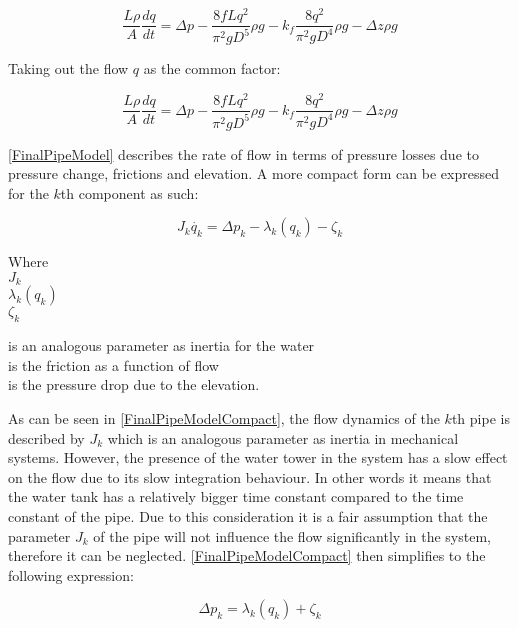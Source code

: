 \begin{equation}
   \frac{L \rho}{A} \frac{dq}{dt} =\Delta p - \frac{8fLq^2}{\pi^{2}gD^5} \rho g - k_f \frac{8q^2}{\pi^2gD^4} \rho g - \Delta z \rho g 
\end{equation}

Taking out the flow $q$ as the common factor:

\begin{equation}
\label{FinalPipeModel}
   \frac{L \rho}{A} \frac{dq}{dt} =\Delta p - \frac{8fLq^2}{\pi^{2}gD^5} \rho g - k_f \frac{8q^2}{\pi^2gD^4} \rho g - \Delta z \rho g 
\end{equation}

\eqref{FinalPipeModel} describes the rate of flow in terms of pressure losses due to pressure change, frictions and elevation. A more compact form can be expressed for the $k$th component as such:

\begin{equation}
\label{FinalPipeModelCompact}
   J_k \dot{q_k} = \Delta p_k - \lambda_k(q_k) - \zeta_k 
\end{equation}

 \begin{minipage}[t]{0.20\textwidth}
Where\\
\hspace*{8mm} $J_k$ \\
\hspace*{8mm} $\lambda_k(q_k)$ \\
\hspace*{8mm} $\zeta_k$ 
\end{minipage}
\begin{minipage}[t]{0.68\textwidth}
\vspace*{2mm}
is an analogous parameter as inertia for the water\\ 
is the friction as a function of flow\\
is the pressure drop due to the elevation.
\end{minipage}

As can be seen in \eqref{FinalPipeModelCompact}, the flow dynamics of the $k$th pipe is described by $J_k$ which is an analogous parameter as inertia in mechanical systems. However, the presence of the water tower in the system has a slow effect on the flow due to its slow integration behaviour. In other words it means that the water tank has a relatively bigger time constant compared to the time constant of the pipe. Due to this consideration it is a fair assumption that the parameter $J_k$ of the pipe will not influence the flow significantly in the system, therefore it can be neglected. \eqref{FinalPipeModelCompact} then simplifies to the following expression: 
  
\begin{equation}
\label{FinalPipeModelSimplified}
  \Delta p_k  =   \lambda_k(q_k) + \zeta_k 
\end{equation}


